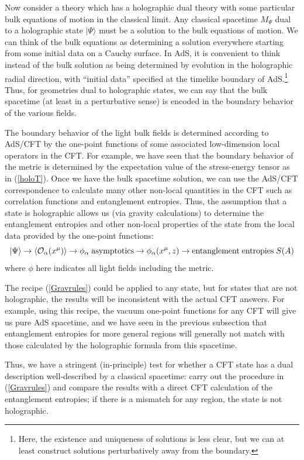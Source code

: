 \documentclass[12pt,epsf]{article}
\newcommand{\be}{\begin{equation}}
\newcommand{\ee}{\end{equation}}
\begin{document}
Now consider a theory which has a holographic dual theory with some particular bulk equations of motion in the classical limit. Any classical spacetime $M_\Psi$ dual to a holographic state $|\Psi \rangle$ must be a solution to the bulk equations of motion. We can think of the bulk equations as determining a solution everywhere starting from some initial data on a Cauchy surface. In AdS, it is convenient to think instead of the bulk solution as being determined by evolution in the holographic radial direction, with ``initial data'' specified at the timelike boundary of AdS.\footnote{Here, the existence and uniqueness of solutions is less clear, but we can at least construct solutions perturbatively away from the boundary.} Thus, for geometries dual to holographic states, we can say that the bulk spacetime (at least in a perturbative sense) is encoded in the boundary behavior of the various fields.

The boundary behavior of the light bulk fields is determined according to AdS/CFT by the one-point functions of some associated low-dimension local operators in the CFT. For example, we have seen that the boundary behavior of the metric is determined by the expectation value of the stress-energy tensor as in (\ref{holoT}). Once we have the bulk spacetime solution, we can use the AdS/CFT correspondence to calculate many other non-local quantities in the CFT such as correlation functions and entanglement entropies. Thus, the assumption that a state is holographic allows us (via gravity calculations) to determine the entanglement entropies and other non-local properties of the state from the local data provided by the one-point functions:
\be
\label{Gravrules}
|\Psi \rangle \rightarrow \langle {\cal O}_\alpha(x^\mu)\rangle \rightarrow \phi_\alpha {\rm \; asymptotics}  \rightarrow \phi_\alpha (x^\mu, z) \rightarrow {\rm entanglement \; entropies \;} S(A)
\ee
where $\phi$ here indicates all light fields including the metric.

The recipe (\ref{Gravrules}) could be applied to any state, but for states that are not holographic, the results will be inconsistent with the actual CFT answers. For example, using this recipe, the vacuum one-point functions for any CFT will give us pure AdS spacetime, and we have seen in the previous subsection that entanglement entropies for more general regions will generally not match with those calculated by the holographic formula from this spacetime.

Thus, we have a stringent (in-principle) test for whether a CFT state has a dual description well-described by a classical spacetime: carry out the procedure in (\ref{Gravrules}) and compare the results with a direct CFT calculation of the entanglement entropies; if there is a mismatch for any region, the state is not holographic.
\end{document}
